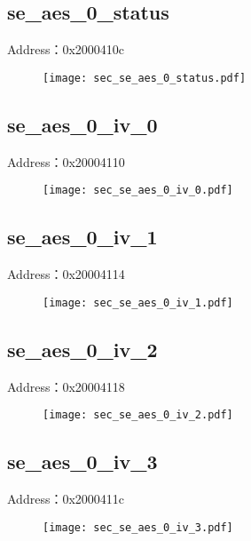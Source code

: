 \subsection{se\_aes\_0\_status}
\label{sec-se-aes-0-status}
Address：0x2000410c
 \begin{figure}[H]
\texttt{[image: sec\_se\_aes\_0\_status.pdf]}
\end{figure}

\subsection{se\_aes\_0\_iv\_0}
\label{sec-se-aes-0-iv-0}
Address：0x20004110
 \begin{figure}[H]
\texttt{[image: sec\_se\_aes\_0\_iv\_0.pdf]}
\end{figure}

\subsection{se\_aes\_0\_iv\_1}
\label{sec-se-aes-0-iv-1}
Address：0x20004114
 \begin{figure}[H]
\texttt{[image: sec\_se\_aes\_0\_iv\_1.pdf]}
\end{figure}

\subsection{se\_aes\_0\_iv\_2}
\label{sec-se-aes-0-iv-2}
Address：0x20004118
 \begin{figure}[H]
\texttt{[image: sec\_se\_aes\_0\_iv\_2.pdf]}
\end{figure}

\subsection{se\_aes\_0\_iv\_3}
\label{sec-se-aes-0-iv-3}
Address：0x2000411c
 \begin{figure}[H]
\texttt{[image: sec\_se\_aes\_0\_iv\_3.pdf]}
\end{figure}


